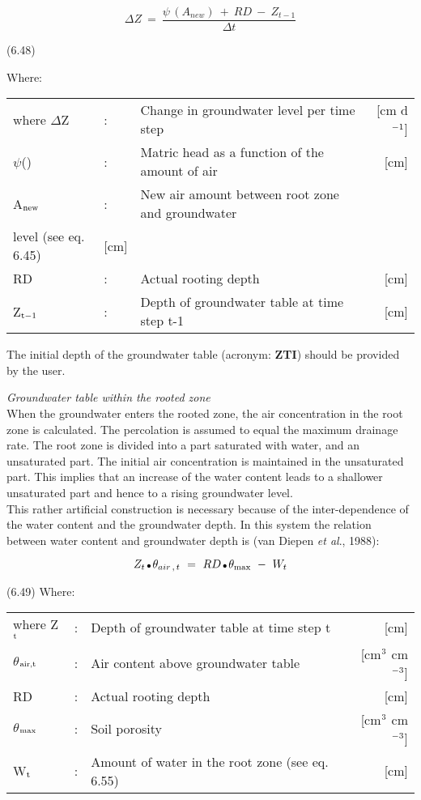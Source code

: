 \begin{equation}
\Delta Z~=~{\frac{\psi \, (A _{new} ) ~+~RD~-~Z _{t-1} }{\Delta t}}
\end{equation}

 
\strut\hfill (6.48)

Where:\\
\begin{tabularx}{\textwidth}{llXr}



where $\Delta$Z &:& Change in groundwater level per time step  & [cm d$^{{\rm -1}}$]\\
$\psi$() &:& Matric head as a function of the amount of air  & [cm]\\
A$_{{\rm new}}$ &:& New air amount between root zone and groundwater\\
   level (see eq. 6.45)  & [cm]\\
RD &:& Actual rooting depth  & [cm]\\
Z$_{{\rm t-1}}$ &:& Depth of groundwater table at time step t-1  & [cm]
\end{tabularx}



The initial depth of the groundwater table (acronym: {\bf ZTI}) should be provided by the
user. 


 {\it Groundwater table within the rooted zone\/}\\
When the groundwater enters the rooted zone, the air concentration in the root zone is
calcu\-lated. The percolation is assumed to equal the maximum drainage rate. The root
zone is divided into a part saturated with water, and an unsaturated part. The initial air
concentration is maintained in the unsaturated part. This implies that an increase of the
water content leads to a shallower unsaturated part and hence to a rising groundwater
level. \\
This rather artificial construction is necessary because of the inter-dependence of the
water content and the groundwater depth. In this system the relation between water
content and groundwater depth is (van Diepen {\it et al\/}., 1988):

\begin{equation}
Z _{t} \, {\rm \Bullet{0.75ex}}\, \theta _{air\, ,\, t} ~=~ RD\, {\rm \Bullet{0.75ex}}\, \theta _{\max } ~-~ W _{t} 
\end{equation}

 
\strut\hfill (6.49)
Where:\\
\begin{tabularx}{\textwidth}{llXr}



where Z$_{{\rm t}}$ &:& Depth of groundwater table at time step t  & [cm]\\
$\theta$$_{{\rm air,t}}$ &:& Air content above groundwater table  & [cm$^{{\rm 3}}$ cm$^{{\rm -3}}$]\\
RD &:& Actual rooting depth  & [cm]\\
$\theta$$_{{\rm max}}$ &:& Soil porosity  & [cm$^{{\rm 3}}$ cm$^{{\rm -3}}$]\\
W$_{{\rm t}}$ &:& Amount of water in the root zone (see eq. 6.55)  & [cm]
\end{tabularx}



